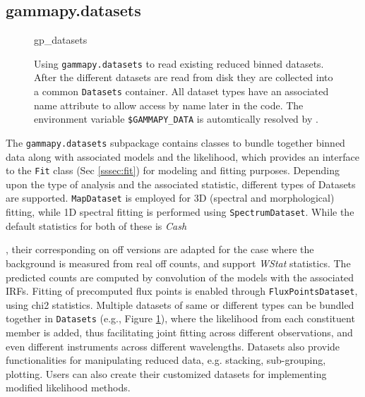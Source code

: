 \documentclass[traditabstract, longauth]{aa}
\newcommand{\code}[1]{\texttt{#1}}
\begin{document}
{\subsection{gammapy.datasets}
\label{ssec:gammapy-datasets}
%
\begin{figure}
	\small
	{gp_datasets}
	\caption{
        Using \code{gammapy.datasets} to read existing reduced binned datasets.
        After the different datasets are read from disk they are collected into a
        common \code{Datasets} container. All dataset types have an associated
        name attribute to allow access by name later in the code. The
        environment variable \code{\$GAMMAPY\_DATA} is automtically resolved
        by \gammapy.
    }
	\label{fig*:minted:gp_datasets}
\end{figure}
%
The \code{gammapy.datasets} subpackage contains classes to bundle
together binned data along with associated models and the likelihood, which
provides an interface to the \code{Fit} class (Sec \ref{sssec:fit}) for
modeling and fitting purposes. Depending upon the type of analysis and the
associated statistic, different types of Datasets are supported. \code{MapDataset} is
employed for 3D (spectral and morphological) fitting, while 1D spectral fitting is
performed using \code{SpectrumDataset}. While the default statistics for both of these is
\emph{Cash}}, their corresponding on off versions are adapted for the case where the
background is measured from real off counts, and support \emph{WStat} statistics. The
predicted counts are computed by convolution of the models with the associated
IRFs. Fitting of precomputed flux points is enabled through \code{FluxPointsDataset},
using chi2 statistics. Multiple datasets of same or different types can be
bundled together in \code{Datasets} (e.g., Figure \ref{fig*:minted:gp_datasets}),
where the likelihood from each constituent member is added, thus facilitating
joint fitting across different observations, and even different instruments
across different wavelengths. Datasets also provide functionalities for
manipulating reduced data, e.g. stacking, sub-grouping, plotting. Users can
also create their customized datasets for implementing modified likelihood
methods.
\end{document}
